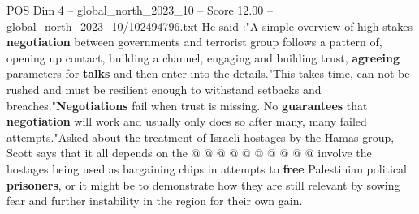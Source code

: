 \begin{textsample}{POS Dim 4 – global\_north\_2023\_10 – Score 12.00 – global\_north\_2023\_10/102494796.txt}
He said :"A simple overview of high-stakes \textbf{negotiation} between governments and terrorist group follows a pattern of, opening up contact, building a channel, engaging and building trust, \textbf{agreeing} parameters for \textbf{talks} and then enter into the details."This takes time, can not be rushed and must be resilient enough to withstand setbacks and breaches."\textbf{Negotiations} fail when trust is missing.
No \textbf{guarantees} that \textbf{negotiation} will work and usually only does so after many, many failed attempts."Asked about the treatment of Israeli hostages by the Hamas group, Scott says that it all depends on the @ @ @ @ @ @ @ @ @ @ involve the hostages being used as bargaining chips in attempts to \textbf{free} Palestinian political \textbf{prisoners}, or it might be to demonstrate how they are still relevant by sowing fear and further instability in the region for their own gain.

\end{textsample}
